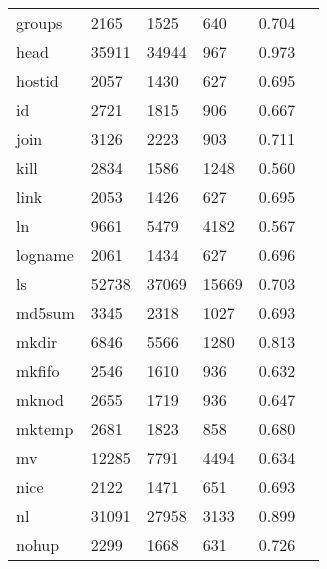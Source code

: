 \begin{longtable}{lp{2.20cm}p{2.20cm}p{2.20cm}p{2.20cm}p{2.20cm}}
groups    &                     2165 &         1525 &           640 &                    0.704 \\
head      &                    35911 &        34944 &           967 &                    0.973 \\
hostid    &                     2057 &         1430 &           627 &                    0.695 \\
id        &                     2721 &         1815 &           906 &                    0.667 \\
join      &                     3126 &         2223 &           903 &                    0.711 \\
kill      &                     2834 &         1586 &          1248 &                    0.560 \\
link      &                     2053 &         1426 &           627 &                    0.695 \\
ln        &                     9661 &         5479 &          4182 &                    0.567 \\
logname   &                     2061 &         1434 &           627 &                    0.696 \\
ls        &                    52738 &        37069 &         15669 &                    0.703 \\
md5sum    &                     3345 &         2318 &          1027 &                    0.693 \\
mkdir     &                     6846 &         5566 &          1280 &                    0.813 \\
mkfifo    &                     2546 &         1610 &           936 &                    0.632 \\
mknod     &                     2655 &         1719 &           936 &                    0.647 \\
mktemp    &                     2681 &         1823 &           858 &                    0.680 \\
mv        &                    12285 &         7791 &          4494 &                    0.634 \\
nice      &                     2122 &         1471 &           651 &                    0.693 \\
nl        &                    31091 &        27958 &          3133 &                    0.899 \\
nohup     &                     2299 &         1668 &           631 &                    0.726 \\

\end{longtable}
